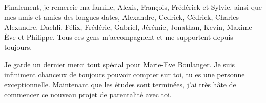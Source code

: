 Finalement,
je remercie ma famille, Alexis, François, Frédérick et Sylvie,
ainsi que mes amis et amies des longues dates, Alexandre, Cedrick, Cédrick, Charles-Alexandre,
Daehli, Félix, Frédéric, Gabriel, Jérémie, Jonathan, Kevin, Maxime-Ève et Philippe.
Tous ces gens m'accompagnent et me supportent depuis toujours.

Je garde un dernier merci tout spécial pour Marie-Eve Boulanger.
Je suis infiniment chanceux de toujours pouvoir compter sur toi,
tu es une personne exceptionnelle.
Maintenant que les études sont terminées,
j'ai très hâte de commencer ce nouveau projet de parentalité avec toi.

